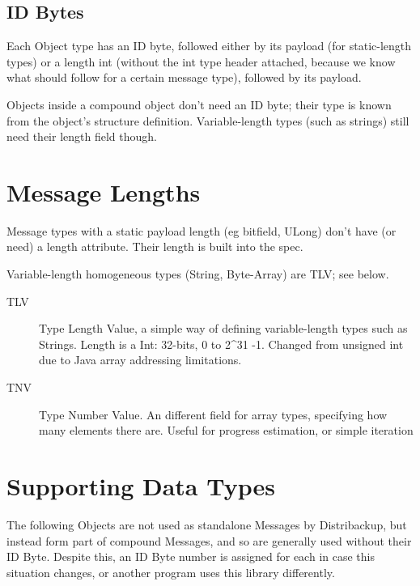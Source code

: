 \documentclass[12pt,a4paper,]{adreport}
\begin{document}
\subsection{ID Bytes}\label{id-bytes}

Each Object type has an ID byte, followed either by its payload (for
static-length types) or a length int (without the int type header
attached, because we know what should follow for a certain message
type), followed by its payload.

Objects inside a compound object don't need an ID byte; their type is
known from the object's structure definition. Variable-length types
(such as strings) still need their length field though.

\section{Message Lengths}\label{message-lengths}

Message types with a static payload length (eg bitfield, ULong) don't
have (or need) a length attribute. Their length is built into the spec.

Variable-length homogeneous types (String, Byte-Array) are TLV; see
below.

\begin{description}
\item[TLV]
Type Length Value, a simple way of defining variable-length types such
as Strings. Length is a Int: 32-bits, 0 to 2\^{}31 -1. Changed from
unsigned int due to Java array addressing limitations.
\item[TNV]
Type Number Value. An different field for array types, specifying how
many elements there are. Useful for progress estimation, or simple
iteration
\end{description}

\section{Supporting Data Types}\label{supporting-data-types}

The following Objects are not used as standalone Messages by
Distribackup, but instead form part of compound Messages, and so are
generally used without their ID Byte. Despite this, an ID Byte number is
assigned for each in case this situation changes, or another program
uses this library differently.
\end{document}
